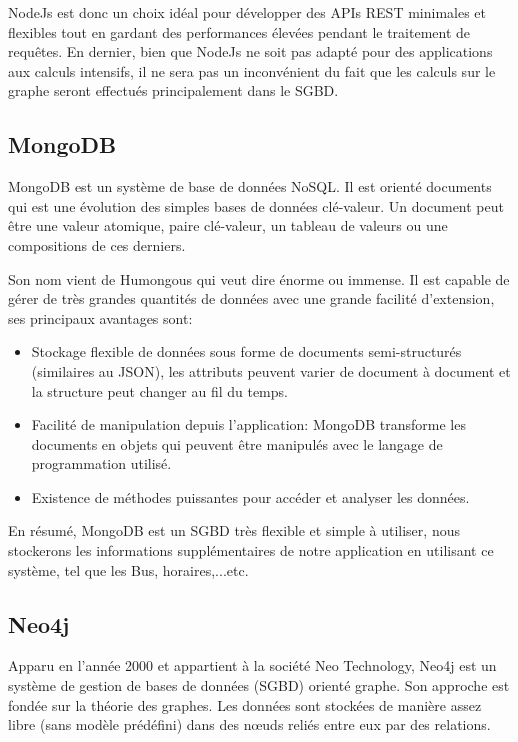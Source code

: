 NodeJs est donc un choix idéal pour développer des APIs REST minimales et flexibles tout en gardant des performances élevées pendant le traitement de requêtes.\newline
En dernier, bien que NodeJs ne soit pas adapté pour des applications aux calculs intensifs, il ne sera pas un inconvénient du fait que les calculs sur le graphe seront effectués principalement dans le SGBD.
\subsection{MongoDB}
	MongoDB \cite{MongoDB} est un système de base de données NoSQL. Il est orienté documents qui est une évolution des simples bases de données clé-valeur. Un document peut être une valeur atomique, paire clé-valeur, un tableau de valeurs ou une compositions de ces derniers.

Son nom vient de Humongous qui veut dire énorme ou immense. Il est capable de gérer de très grandes quantités de données avec une grande facilité d'extension, ses principaux avantages sont:

\begin{itemize}
	\item Stockage flexible de données sous forme de documents semi-structurés (similaires au JSON), les attributs peuvent varier de document à document et la structure peut changer au fil du temps.
	\item Facilité de manipulation depuis l'application: MongoDB transforme les documents en objets qui peuvent être manipulés avec le langage de programmation utilisé.
	\item Existence de méthodes puissantes pour accéder et analyser les données.
\end{itemize}

En résumé, MongoDB est un SGBD très flexible et simple à utiliser, nous stockerons les informations supplémentaires de notre application en utilisant ce système, tel que les Bus, horaires,...etc.

\subsection{Neo4j}
Apparu en l'année 2000 et appartient à la société Neo Technology, Neo4j \cite{Neo4j} est un système de gestion de bases de données (SGBD) orienté graphe. Son approche est fondée sur la théorie des graphes. Les données sont stockées de manière assez libre (sans modèle prédéfini) dans des nœuds reliés entre eux par des relations.

